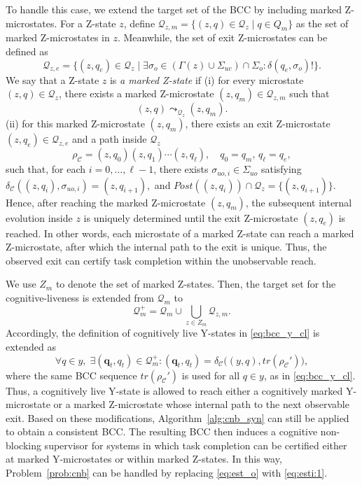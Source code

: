 \documentclass[journal,twoside,web]{ieeecolor}
\begin{document}
To handle this case, we extend the target set of the BCC by including marked Z-microstates. 
For a Z-state $z$, define
$
    \bm{\mathcal{Q}}_{z,m} = \{(z,q)\in \bm{\mathcal{Q}}_z \mid q\in Q_m\}
$
as the set of marked Z-microstates in $z$. 
Meanwhile, the set of exit Z-microstates can be defined as
$$
    \bm{\mathcal{Q}}_{z,e}
    =
    \{ (z, q_e) \in \bm{\mathcal{Q}}_z \mid
    \exists \sigma_o \in (\Gamma(z) \cup \Sigma_{uc}) \cap \Sigma_o : \delta(q_e,\sigma_o)! \}.
$$
%
We say that a Z-state $z$ is \emph{a marked Z-state} if (i) for every microstate $(z,q)\in \bm{\mathcal{Q}}_z$, there exists a marked Z-microstate $(z,q_m)\in \bm{\mathcal{Q}}_{z,m}$ such that
$$
    (z,q) \leadsto_{\bm{\mathcal{Q}}_z} (z,q_m).
$$
(ii) for this marked Z-microstate $(z, q_m)$, there exists an exit Z-microstate $(z, q_e)\in \bm{\mathcal{Q}}_{z,e}$ and a path inside $\bm{\mathcal{Q}}_z$
$$
    \rho_{\mathcal{C}}
    =
    (z,q_0)(z,q_1)\cdots(z,q_\ell),
    \quad
    q_0=q_m, \, q_\ell=q_e,
$$
such that, for each $i=0,\ldots,\ell-1$, there exists $\sigma_{uo,i} \in \Sigma_{uo}$ satisfying
$
    \delta_{\mathcal{C}}((z,q_i),\sigma_{uo,i}) = (z,q_{i+1}),
$
and
$
    Post((z,q_i))\cap \bm{\mathcal{Q}}_z = \{ (z, q_{i+1}) \}.
$
Hence, after reaching the marked Z-microstate $(z,q_m)$, the subsequent internal evolution inside $z$ is uniquely determined until the exit Z-microstate $(z,q_e)$ is reached.
%
In other words, each microstate of a marked Z-state can reach a marked Z-microstate, after which the internal path to the exit is unique. 
Thus, the observed exit can certify task completion within the unobservable reach.

We use $Z_m$ to denote the set of marked Z-states.
Then, the target set for the cognitive-liveness is extended from
$\bm{\mathcal{Q}}_m$ to
\begin{equation}
    \bm{\mathcal{Q}}_m^{+}
    =
    \bm{\mathcal{Q}}_m
    \cup
    \bigcup_{z\in Z_m}\bm{\mathcal{Q}}_{z,m}.
    \label{eq:extended_target_set}
\end{equation}
Accordingly, the definition of cognitively live Y-states in
\eqref{eq:bcc_y_cl} is extended as
\begin{equation}
\label{eq:bcc_y_cl:2}
    \forall q \in y,\;
    \exists (\bm q_t,q_t)\in \bm{\mathcal{Q}}_m^{+}
    :
    (\bm q_t,q_t)
    =
    \delta_{\mathcal{C}}
    \big((y,q),tr(\rho_{\mathcal{C}}')\big),
\end{equation}
where the same BCC sequence $tr(\rho_{\mathcal{C}}')$ is used for all
$q\in y$, as in \eqref{eq:bcc_y_cl}.
Thus, a cognitively live Y-state is allowed to reach either a cognitively
marked Y-microstate or a marked Z-microstate whose internal path to the
next observable exit.
%
Based on these modifications, Algorithm~\ref{alg:cnb_syn} can still be
applied to obtain a consistent BCC. The resulting BCC then induces a
cognitive non-blocking supervisor for systems in which task completion can
be certified either at marked Y-microstates or within marked Z-states.
In this way, Problem~\ref{prob:cnb} can be handled by replacing
\eqref{eq:est_o} with \eqref{eq:esti:1}.
\end{document}
